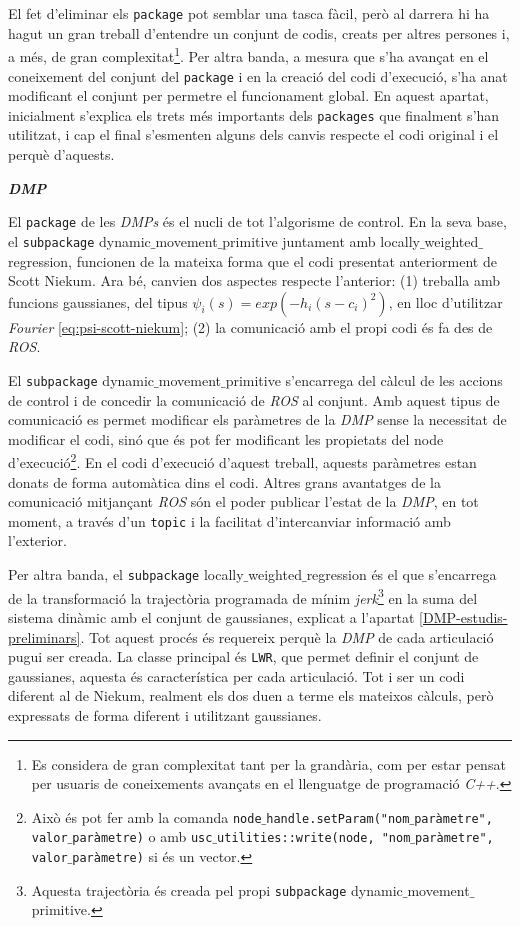 \documentclass[12pt,a4paper,final,twoside]{article}
\begin{document}
El fet d'eliminar els \texttt{package} pot semblar una tasca fàcil, però al darrera hi ha hagut un gran treball d'entendre un conjunt de codis, creats per altres persones i, a més, de gran complexitat\footnote{Es considera de gran complexitat tant per la grandària, com per estar pensat per usuaris de coneixements avançats en el llenguatge de programació \textit{C++}.}. Per altra banda, a mesura que s'ha avançat en el coneixement del conjunt del \texttt{package} i en la creació del codi d'execució, s'ha anat modificant el conjunt per permetre el funcionament global. En aquest apartat, inicialment s'explica els trets més importants dels \texttt{packages} que finalment s'han utilitzat, i cap el final s'esmenten alguns dels canvis respecte el codi original i el perquè d'aquests.


\vspace{20pt}
\textbf{\textit{DMP}}

El \texttt{package} de les \textit{DMPs} és el nucli de tot l'algorisme de control. En la seva base, el \texttt{subpackage} dynamic$\_$movement$\_$primitive juntament amb locally$\_$weighted$\_$regression, funcionen de la mateixa forma que el codi presentat anteriorment de Scott Niekum. Ara bé, canvien dos aspectes respecte l'anterior: (1) treballa amb funcions gaussianes, del tipus $\psi_i(s)=exp(-h_i(s-c_i)^2)$, en lloc d'utilitzar \textit{Fourier} \eqref{eq:psi-scott-niekum}; (2) la comunicació amb el propi codi és fa des de \textit{ROS}. 

El \texttt{subpackage} dynamic$\_$movement$\_$primitive s'encarrega del càlcul de les accions de control i de concedir la comunicació de \textit{ROS} al conjunt. Amb aquest tipus de comunicació es permet modificar els paràmetres de la \textit{DMP} sense la necessitat de modificar el codi, sinó que és pot fer modificant les propietats del node d'execució\footnote{Això és pot fer amb la comanda \texttt{node$\_$handle.setParam("nom$\_$paràmetre", valor$\_$paràmetre)} o amb \texttt{usc$\_$utilities::write(node, "nom$\_$paràmetre", valor$\_$paràmetre)} si és un vector.}. En el codi d'execució d'aquest treball, aquests paràmetres estan donats de forma automàtica dins el codi. Altres grans avantatges de la comunicació mitjançant \textit{ROS} són el poder publicar l'estat de la \textit{DMP}, en tot moment, a través d'un \texttt{topic} i la facilitat d'intercanviar informació amb l'exterior.


Per altra banda, el \texttt{subpackage} locally$\_$weighted$\_$regression és el que s'encarrega de la transformació la trajectòria programada de mínim \textit{jerk}\footnote{Aquesta trajectòria és creada pel propi \texttt{subpackage} dynamic$\_$movement$\_$primitive.} en la suma del sistema dinàmic amb el conjunt de gaussianes, explicat a l'apartat \ref{DMP-estudis-preliminars}. Tot aquest procés és requereix perquè la \textit{DMP} de cada articulació pugui ser creada. La classe principal és \texttt{LWR}, que permet definir el conjunt de gaussianes, aquesta és característica per cada articulació. Tot i ser un codi diferent al de Niekum, realment els dos duen a terme els mateixos càlculs, però expressats de forma diferent i utilitzant gaussianes.
\end{document}

